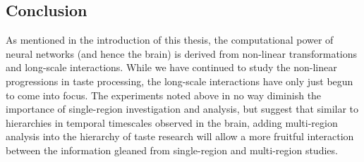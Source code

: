 \begin{refsection}
\section{Conclusion}
As mentioned in the introduction of this thesis, the computational power of neural networks (and hence the brain) is derived from non-linear transformations and long-scale interactions. While we have continued to study the non-linear progressions in taste processing, the long-scale interactions have only just begun to come into focus. The experiments noted above in no way diminish the importance of single-region investigation and analysis, but suggest that similar to hierarchies in temporal timescales observed in the brain, adding multi-region analysis into the hierarchy of taste research will allow a more fruitful interaction between the information gleaned from single-region and multi-region studies.


\printbibliography[title={References}]
\end{refsection}